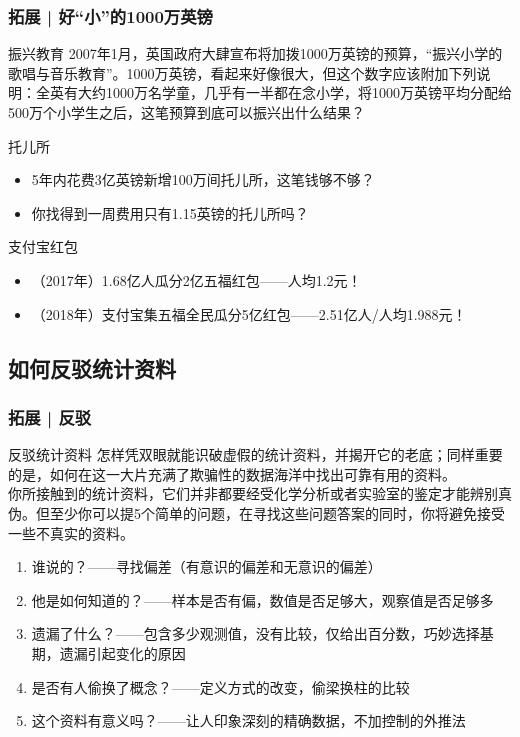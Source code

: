 \begin{frame}
  \frametitle{拓展 | 好“小”的1000万英镑}
  \begin{block}{振兴教育}
    2007年1月，英国政府大肆宣布将加拨1000万英镑的预算，“振兴小学的歌唱与音乐教育”。1000万英镑，看起来好像很大，但这个数字应该附加下列说明：全英有大约1000万名学童，几乎有一半都在念小学，将1000万英镑平均分配给500万个小学生之后，这笔预算到底可以振兴出什么结果？
  \end{block}
  \pause
  \begin{block}{托儿所}
    \begin{itemize}
      \item 5年内花费3亿英镑新增100万间托儿所，这笔钱够不够？
      \item 你找得到一周费用只有1.15英镑的托儿所吗？
    \end{itemize}
  \end{block}
  \pause
  \begin{block}{支付宝红包}
    \begin{itemize}
      \item （2017年）1.68亿人瓜分2亿五福红包——人均1.2元！
      \item （2018年）支付宝集五福全民瓜分5亿红包——2.51亿人/人均1.988元！
    \end{itemize}
  \end{block}
\end{frame}

\subsection{如何反驳统计资料}
\begin{frame}
  \frametitle{拓展 | 反驳}
  \begin{block}{\alert{反驳统计资料}}
    怎样凭双眼就能识破虚假的统计资料，并揭开它的老底；同样重要的是，如何在这一大片充满了欺骗性的数据海洋中找出可靠有用的资料。\\
    \vspace{0.5em}
    你所接触到的统计资料，它们并非都要经受化学分析或者实验室的鉴定才能辨别真伪。但至少你可以提5个简单的问题，在寻找这些问题答案的同时，你将避免接受一些不真实的资料。
    \begin{enumerate}
      \item 谁说的？——寻找偏差（有意识的偏差和无意识的偏差）
      \item 他是如何知道的？——样本是否有偏，数值是否足够大，观察值是否足够多
      \item 遗漏了什么？——包含多少观测值，没有比较，仅给出百分数，巧妙选择基期，遗漏引起变化的原因
      \item 是否有人偷换了概念？——定义方式的改变，偷梁换柱的比较
      \item 这个资料有意义吗？——让人印象深刻的精确数据，不加控制的外推法
    \end{enumerate}
  \end{block}
\end{frame}

